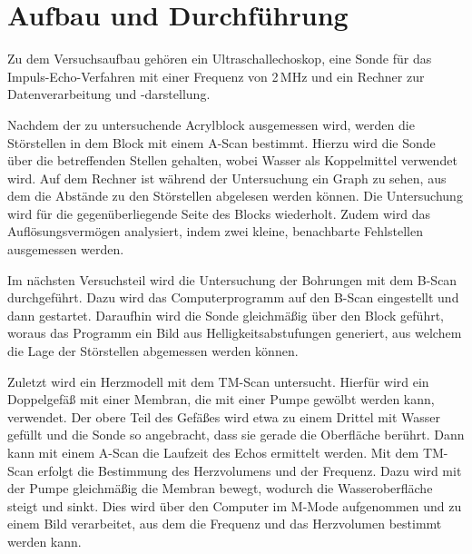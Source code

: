 \section{Aufbau und Durchführung}

Zu dem Versuchsaufbau gehören ein Ultraschallechoskop, eine Sonde für das Impuls-Echo-Verfahren mit einer Frequenz von 2\,MHz und ein Rechner zur Datenverarbeitung und -darstellung.

Nachdem der zu untersuchende Acrylblock ausgemessen wird, werden die Störstellen in dem Block mit einem A-Scan bestimmt. Hierzu wird die Sonde über die betreffenden Stellen gehalten, wobei Wasser als Koppelmittel verwendet wird. Auf dem Rechner 
ist während der Untersuchung ein Graph zu sehen, aus dem die Abstände zu den Störstellen abgelesen werden können. Die Untersuchung wird für die gegenüberliegende Seite des Blocks wiederholt.
Zudem wird das Auflösungsvermögen analysiert, indem zwei kleine, benachbarte Fehlstellen ausgemessen werden.

Im nächsten Versuchsteil wird die Untersuchung der Bohrungen mit dem B-Scan durchgeführt. Dazu wird das Computerprogramm auf den B-Scan eingestellt und dann gestartet. Daraufhin wird die Sonde gleichmäßig über den Block geführt, woraus das Programm 
ein Bild aus Helligkeitsabstufungen generiert, aus welchem die Lage der Störstellen abgemessen werden können.

Zuletzt wird ein Herzmodell mit dem TM-Scan untersucht. Hierfür wird ein Doppelgefäß mit einer Membran, die mit einer Pumpe gewölbt werden kann, verwendet. Der obere Teil des Gefäßes wird etwa zu einem Drittel mit Wasser gefüllt und die Sonde so 
angebracht, dass sie gerade die Oberfläche berührt. Dann kann mit einem A-Scan die Laufzeit des Echos ermittelt werden. Mit dem TM-Scan erfolgt die Bestimmung des Herzvolumens und der Frequenz. Dazu wird mit der Pumpe gleichmäßig die Membran bewegt,
wodurch die Wasseroberfläche steigt und sinkt. Dies wird über den Computer im M-Mode aufgenommen und zu einem Bild verarbeitet, aus dem die Frequenz und das Herzvolumen bestimmt werden kann.
